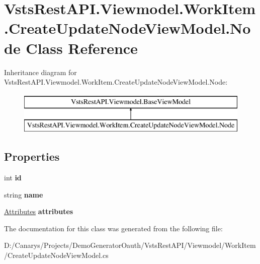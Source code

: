 \hypertarget{class_vsts_rest_a_p_i_1_1_viewmodel_1_1_work_item_1_1_create_update_node_view_model_1_1_node}{}\section{Vsts\+Rest\+A\+P\+I.\+Viewmodel.\+Work\+Item.\+Create\+Update\+Node\+View\+Model.\+Node Class Reference}
\label{class_vsts_rest_a_p_i_1_1_viewmodel_1_1_work_item_1_1_create_update_node_view_model_1_1_node}
Inheritance diagram for Vsts\+Rest\+A\+P\+I.\+Viewmodel.\+Work\+Item.\+Create\+Update\+Node\+View\+Model.\+Node\+:\begin{figure}[H]
\begin{center}
\leavevmode
\includegraphics[height=2.000000cm]{class_vsts_rest_a_p_i_1_1_viewmodel_1_1_work_item_1_1_create_update_node_view_model_1_1_node}
\end{center}
\end{figure}
\subsection*{Properties}
\begin{DoxyCompactItemize}
\item 
\mbox{\label{class_vsts_rest_a_p_i_1_1_viewmodel_1_1_work_item_1_1_create_update_node_view_model_1_1_node_a0925513df29c064d38b264758547578c}} 
int {\bfseries id}
\item 
\mbox{\label{class_vsts_rest_a_p_i_1_1_viewmodel_1_1_work_item_1_1_create_update_node_view_model_1_1_node_a970f0727dddc9d4e47654a54d2445117}} 
string {\bfseries name}
\item 
\mbox{\label{class_vsts_rest_a_p_i_1_1_viewmodel_1_1_work_item_1_1_create_update_node_view_model_1_1_node_a030c993e6c05f1b67d6a52d7a2d1e9e6}} 
\mbox{\hyperlink{class_vsts_rest_a_p_i_1_1_viewmodel_1_1_work_item_1_1_create_update_node_view_model_1_1_attributes}{Attributes}} {\bfseries attributes}
\end{DoxyCompactItemize}


The documentation for this class was generated from the following file\+:\begin{DoxyCompactItemize}
\item 
D\+:/\+Canarys/\+Projects/\+Demo\+Generator\+Oauth/\+Vsts\+Rest\+A\+P\+I/\+Viewmodel/\+Work\+Item/Create\+Update\+Node\+View\+Model.\+cs\end{DoxyCompactItemize}
